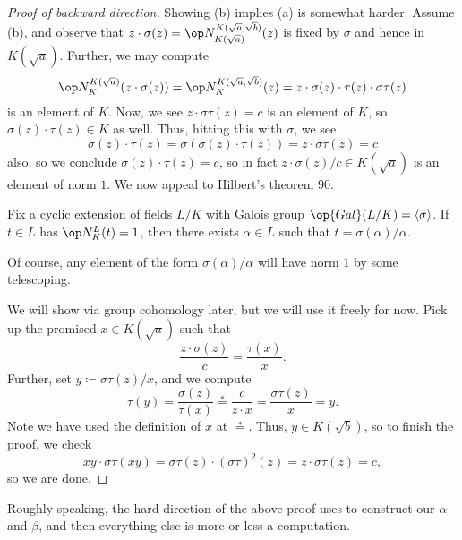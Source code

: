 \documentclass[../notes.tex]{subfiles}
\begin{document}
\begin{proof}[Proof of backward direction]
	Showing (b) implies (a) is somewhat harder. Assume (b), and observe that $z\cdot\sigma(z)=\op N^{K(\sqrt a,\sqrt b)}_{K(\sqrt a)}(z)$ is fixed by $\sigma$ and hence in $K(\sqrt a)$. Further, we may compute
	\[\op N^{K(\sqrt a)}_{K}(z\cdot\sigma(z))=\op N^{K(\sqrt a,\sqrt b)}_{K}(z)=z\cdot\sigma(z)\cdot\tau(z)\cdot\sigma\tau(z)\]
	is an element of $K$. Now, we see $z\cdot\sigma\tau(z)=c$ is an element of $K$, so $\sigma(z)\cdot\tau(z)\in K$ as well. Thus, hitting this with $\sigma$, we see
	\[\sigma(z)\cdot\tau(z)=\sigma(\sigma(z)\cdot\tau(z))=z\cdot\sigma\tau(z)=c\]
	also, so we conclude $\sigma(z)\cdot\tau(z)=c$, so in fact $z\cdot\sigma(z)/c\in K(\sqrt a)$ is an element of norm $1$. We now appeal to Hilbert's theorem 90.
	\begin{theorem}[Hilbert 90] \label{thm:h-90}
		Fix a cyclic extension of fields $L/K$ with Galois group $\op{Gal}(L/K)=\langle\sigma\rangle$. If $t\in L$ has $\op N^L_K(t)=1$, then there exists $\alpha\in L$ such that $t=\sigma(\alpha)/\alpha$.
	\end{theorem}
	\begin{remark}
		Of course, any element of the form $\sigma(\alpha)/\alpha$ will have norm $1$ by some telescoping.
	\end{remark}
	We will show  via group cohomology later, but we will use it freely for now. Pick up the promised $x\in K(\sqrt a)$ such that
	\[\frac{z\cdot\sigma(z)}c=\frac{\tau(x)}x.\]
	Further, set $y\coloneqq\sigma\tau(z)/x$, and we compute
	\[\tau(y)=\frac{\sigma(z)}{\tau(x)}\stackrel*=\frac{c}{z\cdot x}=\frac{\sigma\tau(z)}{x}=y.\]
	Note we have used the definition of $x$ at $\stackrel*=$. Thus, $y\in K(\sqrt b)$, so to finish the proof, we check
	\[xy\cdot\sigma\tau(xy)=\sigma\tau(z)\cdot(\sigma\tau)^2(z)=z\cdot\sigma\tau(z)=c,\]
	so we are done.
\end{proof}
Roughly speaking, the hard direction of the above proof uses  to construct our $\alpha$ and $\beta$, and then everything else is more or less a computation.
\end{document}
